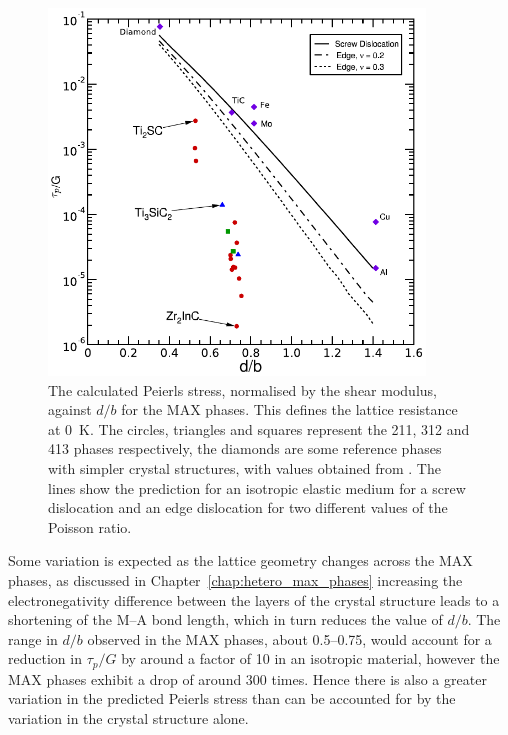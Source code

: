 \begin{figure}
\centering
\includegraphics[width=10cm]{tp_vs_d_upon_b}
\captionsetup{width=12cm}
\caption[The calculated Peierls stresses of the MAX phases.]{The calculated Peierls stress, normalised by the shear modulus, against $d/b$ for the MAX phases. This defines the lattice resistance at \SI{0}{\kelvin}. The circles, triangles and squares represent the 211, 312 and 413 phases respectively, the diamonds are some reference phases with simpler crystal structures, with values obtained from \cite{Clegg2006}. The lines show the prediction for an isotropic elastic medium for a screw dislocation and an edge dislocation for two different values of the Poisson ratio. \label{fig:peierls_stress_vs_d_upon_b}}
\end{figure}


Some variation is expected as the lattice geometry changes across the MAX phases, as discussed in Chapter~\ref{chap:hetero_max_phases} increasing the electronegativity difference between the layers of the crystal structure leads to a shortening of the M--A bond length, which in turn reduces the value of $d/b$. The range in $d/b$ observed in the MAX phases, about \numrange{0.5}{0.75}, would account for a reduction in $\tau_p / G $ by around a factor of \num{10} in an isotropic material, however the MAX phases exhibit a drop of around \num{300} times. Hence there is also a greater variation in the predicted Peierls stress than can be accounted for by the variation in the crystal structure alone. 


